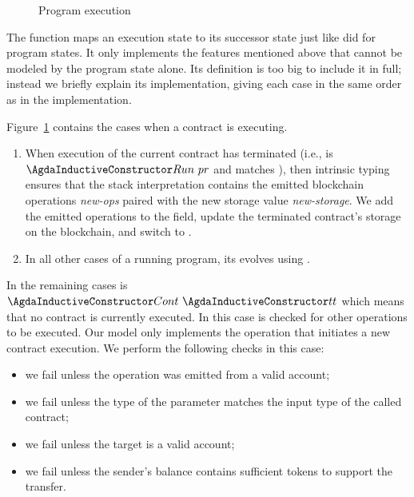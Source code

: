 \begin{figure}[tp]
  \ConcreteExecStepProgram
  \caption{Program execution}
  \label{fig:exec-step-1}
\end{figure}
The function {\ConcreteExecStep} maps an execution state to its successor state
just like  did for program states.
It only implements the features mentioned above that cannot be modeled
by the program state alone.
Its definition is too big to include it in full; instead
we briefly explain its implementation, giving each case in the same
order as in the implementation.

Figure~\ref{fig:exec-step-1} contains the cases when a contract is executing.
\begin{enumerate}
\item When execution of the current contract has terminated
  (i.e.,  is $\ACon{Run}~pr$ and  matches ),
  then intrinsic typing ensures that  the stack interpretation
  contains the emitted blockchain operations \textit{new-ops}
  paired with the new storage value \textit{new-storage}.
  We add the emitted operations to the  field,
  update the terminated contract's storage on the blockchain, and
  switch to  . 
\item In all other cases of a running program, its  evolves using .
\end{enumerate}
In the remaining cases  is $\ACon{Cont}~\ACon{tt}$ which
means that no contract is currently executed. In this case
 is checked for other operations to be executed. 
Our model only implements the  operation
that initiates a new contract execution.
We perform the following checks in this case:
\begin{itemize}
\item we fail unless the operation was emitted from a valid account;
\item we fail unless the type of the parameter matches the input type of the called contract;
\item we fail unless the target is a valid account;
\item we fail unless the sender's balance
  contains sufficient tokens to support the transfer.
\end{itemize}
